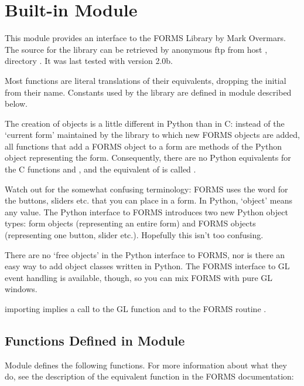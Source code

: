 \section{Built-in Module }
\label{module-fl}

This module provides an interface to the FORMS Library by Mark Overmars.  The source for the
library can be retrieved by anonymous ftp from host
, directory .  It was last tested
with version 2.0b.

Most functions are literal translations of their \C{} equivalents,
dropping the initial  from their name.  Constants used by
the library are defined in module  described below.

The creation of objects is a little different in Python than in C:
instead of the `current form' maintained by the library to which new
FORMS objects are added, all functions that add a FORMS object to a
form are methods of the Python object representing the form.
Consequently, there are no Python equivalents for the C functions
 and , and the
equivalent of  is called
.

Watch out for the somewhat confusing terminology: FORMS uses the word
 for the buttons, sliders etc. that you can place in a form.
In Python, `object' means any value.  The Python interface to FORMS
introduces two new Python object types: form objects (representing an
entire form) and FORMS objects (representing one button, slider etc.).
Hopefully this isn't too confusing.

There are no `free objects' in the Python interface to FORMS, nor is
there an easy way to add object classes written in Python.  The FORMS
interface to GL event handling is available, though, so you can mix
FORMS with pure GL windows.

 importing  implies a call to the GL
function  and to the FORMS routine
.

\subsection{Functions Defined in Module }

Module  defines the following functions.  For more
information about what they do, see the description of the equivalent
\C{} function in the FORMS documentation:

